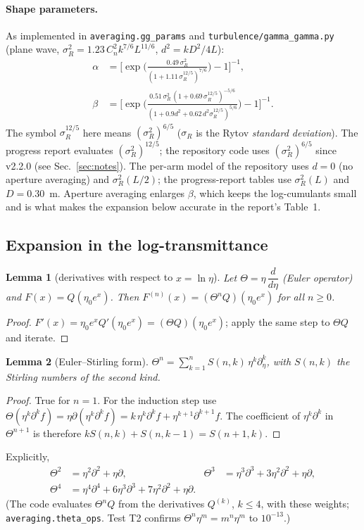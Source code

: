 \documentclass[11pt,a4paper]{article}
\theoremstyle{plain}
\newtheorem{lemma}{Lemma}
\theoremstyle{remark}
\begin{document}
\paragraph{Shape parameters.}
As implemented in \texttt{averaging.gg\_params} and \texttt{turbulence/gamma\_gamma.py} (plane wave, $\sigma_R^2=1.23\,C_n^2k^{7/6}L^{11/6}$, $d^2=kD^2/4L$):
\begin{align}
  \alpha&=\Big[\exp\!\Big(\tfrac{0.49\,\sigma_R^2}{(1+1.11\,\sigma_R^{12/5})^{7/6}}\Big)-1\Big]^{-1},\\
  \beta&=\Big[\exp\!\Big(\tfrac{0.51\,\sigma_R^2\,(1+0.69\,\sigma_R^{12/5})^{-5/6}}{(1+0.9d^2+0.62\,d^2\sigma_R^{12/5})^{5/6}}\Big)-1\Big]^{-1}.
\end{align}
The symbol $\sigma_R^{12/5}$ here means $(\sigma_R^2)^{6/5}$ ($\sigma_R$ is the Rytov \emph{standard deviation}). The progress report evaluates $(\sigma_R^2)^{12/5}$; the repository code uses $(\sigma_R^2)^{6/5}$ since v2.2.0 (see Sec.~\ref{sec:notes}). The per-arm model of the repository uses $d=0$ (no aperture averaging) and $\sigma_R^2(L/2)$; the progress-report tables use $\sigma_R^2(L)$ and $D=0.30$~m. Aperture averaging enlarges $\beta$, which keeps the log-cumulants small and is what makes the expansion below accurate in the report's Table~1.

\subsection{Expansion in the log-transmittance}

\begin{lemma}[derivatives with respect to $x=\ln\eta$]\label{lem:theta}
Let $\Theta=\eta\,\dfrac{d}{d\eta}$ (Euler operator) and $F(x)=Q(\eta_0e^{x})$. Then $F^{(n)}(x)=(\Theta^nQ)(\eta_0e^{x})$ for all $n\ge0$.
\end{lemma}
\begin{proof}
$F'(x)=\eta_0e^{x}Q'(\eta_0e^{x})=(\Theta Q)(\eta_0e^{x})$; apply the same step to $\Theta Q$ and iterate.
\end{proof}

\begin{lemma}[Euler--Stirling form]\label{lem:stirling}
$\Theta^n=\sum_{k=1}^{n}S(n,k)\,\eta^{k}\partial_\eta^{k}$, with $S(n,k)$ the Stirling numbers of the second kind.
\end{lemma}
\begin{proof}
True for $n=1$. For the induction step use $\Theta(\eta^{k}\partial^{k}f)=\eta\partial(\eta^{k}\partial^{k}f)=k\,\eta^{k}\partial^{k}f+\eta^{k+1}\partial^{k+1}f$. The coefficient of $\eta^{k}\partial^{k}$ in $\Theta^{n+1}$ is therefore $kS(n,k)+S(n,k-1)=S(n+1,k)$.
\end{proof}
Explicitly,
\begin{align}
  \Theta^2&=\eta^2\partial^2+\eta\partial, &
  \Theta^3&=\eta^3\partial^3+3\eta^2\partial^2+\eta\partial,\\
  \Theta^4&=\eta^4\partial^4+6\eta^3\partial^3+7\eta^2\partial^2+\eta\partial. & &
\end{align}
(The code evaluates $\Theta^nQ$ from the derivatives $Q^{(k)}$, $k\le4$, with these weights; \texttt{averaging.theta\_ops}. Test T2 confirms $\Theta^n\eta^m=m^n\eta^m$ to $10^{-13}$.)
\end{document}
